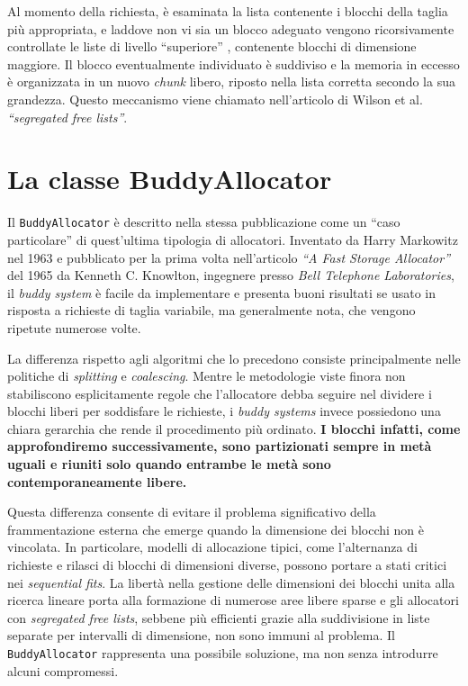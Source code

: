 Al momento della richiesta, è esaminata la lista contenente i blocchi della taglia più appropriata, e laddove non vi sia un blocco adeguato vengono ricorsivamente controllate le liste di livello “superiore” , contenente blocchi di dimensione maggiore. Il blocco eventualmente individuato è suddiviso e la memoria in eccesso è organizzata in un nuovo \textit{chunk} libero, riposto nella lista corretta secondo la sua grandezza. Questo meccanismo viene chiamato nell’articolo di Wilson et al. \textit{“segregated free lists”}.


\section{La classe BuddyAllocator}
Il \texttt{BuddyAllocator} è descritto nella stessa pubblicazione come un “caso particolare” di quest'ultima tipologia di allocatori. Inventato da Harry Markowitz nel 1963 e pubblicato per la prima volta nell’articolo \textit{“A Fast Storage Allocator”}\cite{knowlton1965} del 1965 da Kenneth C. Knowlton, ingegnere presso \textit{Bell Telephone Laboratories}, il \textit{buddy system} è facile da implementare e presenta buoni risultati se usato in risposta a richieste di taglia variabile, ma generalmente nota, che vengono ripetute numerose volte.
 
La differenza rispetto agli algoritmi che lo precedono consiste principalmente nelle politiche di \textit{splitting} e \textit{coalescing}. Mentre le metodologie viste finora non stabiliscono esplicitamente regole che l'allocatore debba seguire nel dividere i blocchi liberi per soddisfare le richieste, i \textit{buddy systems} invece possiedono una chiara gerarchia che rende il procedimento più ordinato. \textbf{I blocchi infatti, come approfondiremo successivamente, sono partizionati sempre in metà uguali e riuniti solo quando entrambe le metà sono contemporaneamente libere.}

Questa differenza consente di evitare il problema significativo della frammentazione esterna che emerge quando la dimensione dei blocchi non è vincolata. In particolare, modelli di allocazione tipici, come l'alternanza di richieste e rilasci di blocchi di dimensioni diverse, possono portare a stati critici nei \textit{sequential fits}. La libertà nella gestione delle dimensioni dei blocchi unita alla ricerca lineare porta alla formazione di numerose aree libere sparse e gli allocatori con \textit{segregated free lists}, sebbene più efficienti grazie alla suddivisione in liste separate per intervalli di dimensione, non sono immuni al problema. Il \texttt{BuddyAllocator} rappresenta una possibile soluzione, ma non senza introdurre alcuni compromessi.

